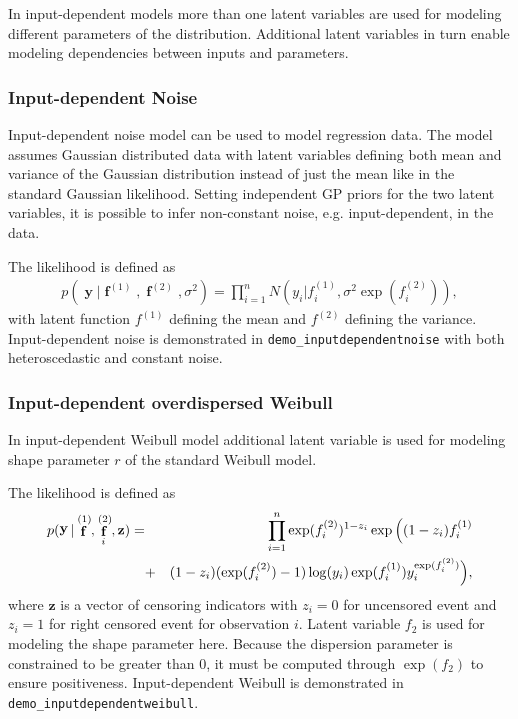 \documentclass[twoside,11pt]{article}
\DeclareMathOperator{\f}{\mathbf{f}}
\DeclareMathOperator{\y}{\mathbf{y}}
\newcommand{\code}[1]{{\normalfont\texttt{#1}}}
\begin{document}
In input-dependent models more than one latent variables are used for modeling different parameters of the distribution. Additional latent variables in turn enable modeling dependencies between inputs and parameters. 

\subsubsection{Input-dependent Noise}
Input-dependent noise model \citep{Goldberg:1997} can be used to model
regression data. The model assumes Gaussian distributed data with
latent variables defining both mean and variance of the Gaussian
distribution instead of just the mean like in the standard Gaussian
likelihood. Setting independent GP priors for the two latent
variables, it is possible to infer non-constant noise,
e.g. input-dependent, in the data.

The likelihood is defined as
\begin{align}
  p(\y|\f^{(1)}, \f^{(2)}, \sigma^2)=\prod_{i=1}^n N(y_i | f_i^{(1)}, \sigma^2 \exp(f_i^{(2)})),
\end{align}
with latent function $f^{(1)}$ defining the mean and $f^{(2)}$
defining the variance. Input-dependent noise is demonstrated in
\code{demo\_inputdependentnoise} with both heteroscedastic and
constant noise.

\subsubsection{Input-dependent overdispersed Weibull}
In input-dependent Weibull model additional latent variable is used for modeling shape parameter $r$ of the standard Weibull model. 

The likelihood is defined as
\begin{eqnarray}
 p( \y |\f^{(1)}, \f_i^{(2)},\mathbf{z}) =&& \prod_{i=1}^n \exp(f_i^{(2)})^{1-z_i} \exp \Big{(} (1-z_i)f^{(1)}_i \\ \nonumber
 &+&(1-z_i)(\exp(f_i^{(2)})-1)\log(y_i)\exp(f^{(1)}_i)y_i^{\exp(f_i^{(2)})} \Big{)}, \nonumber
\end{eqnarray}
where $\mathbf{z}$ is a vector of censoring indicators with $z_i = 0$ for
uncensored event and $z_i = 1$ for right censored event for
observation $i$. Latent variable $f_2$ is used for modeling the shape parameter here. Because the dispersion parameter is constrained to be greater than 0, it must be computed through $\exp(f_2)$ to ensure positiveness. Input-dependent Weibull is demonstrated in \code{demo\_inputdependentweibull}.
\end{document}
